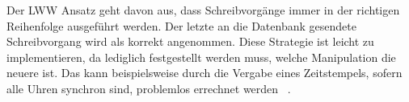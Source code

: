 Der \gls{LWW} Ansatz geht davon aus, dass Schreibvorgänge immer in der richtigen Reihenfolge ausgeführt werden. Der letzte an die Datenbank gesendete Schreibvorgang wird als korrekt angenommen.
Diese Strategie ist leicht zu implementieren, da lediglich festgestellt werden muss, welche Manipulation die neuere ist.
Das kann beispielsweise durch die Vergabe eines Zeitstempels, sofern alle Uhren synchron sind, problemlos errechnet werden ~\cite{lww}.
